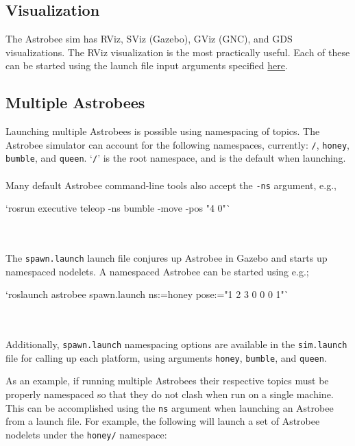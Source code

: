 \documentclass{article}
\begin{document}
\subsection{Visualization}

The Astrobee sim has RViz, SViz (Gazebo), GViz (GNC), and GDS visualizations. The RViz visualization is the most practically useful. Each of these can be started using the launch file input arguments specified \href{https://github.com/nasa/astrobee/tree/master/simulation}{here}.


\subsection{Multiple Astrobees}

Launching multiple Astrobees is possible using namespacing of topics. The Astrobee simulator can account for the following namespaces, currently: \texttt{/}, \texttt{honey}, \texttt{bumble}, and \texttt{queen}. `\texttt{/}' is the root namespace, and is the default when launching.
\\\\
Many default Astrobee command-line tools also accept the \texttt{-ns} argument, e.g.,

\begin{markdown}
`rosrun executive teleop -ns bumble -move -pos "4 0"`
\end{markdown}
\\\\
The \texttt{spawn.launch} launch file conjures up Astrobee in Gazebo and starts up namespaced nodelets. A namespaced Astrobee can be started using e.g.;

\begin{markdown}
`roslaunch astrobee spawn.launch ns:=honey pose:="1 2 3 0 0 0 1"`
\end{markdown}
\\\\
Additionally, \texttt{spawn.launch} namespacing options are available in the \texttt{sim.launch} file for calling up each platform, using arguments \texttt{honey}, \texttt{bumble}, and \texttt{queen}.

As an example, if running multiple Astrobees their respective topics must be properly namespaced so that they do not clash when run on a single machine. This can be accomplished using the \texttt{ns} argument when launching an Astrobee from a launch file. For example, the following will launch a set of Astrobee nodelets under the \texttt{honey/} namespace:
\end{document}
